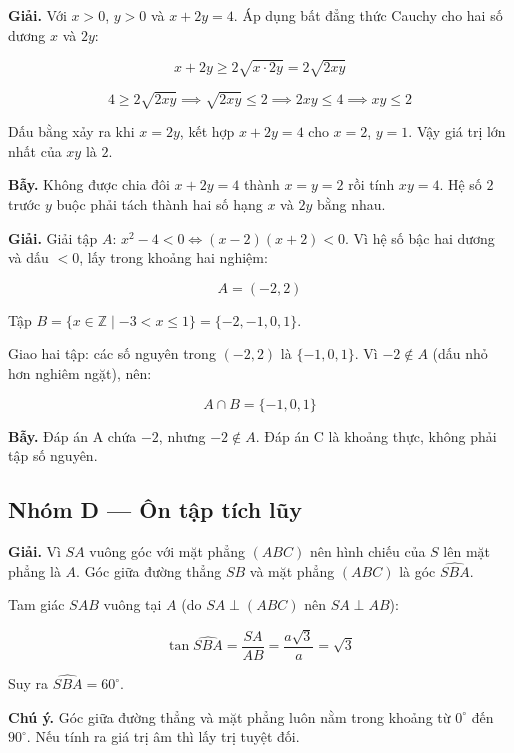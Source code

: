 \documentclass[11pt, a4paper]{article}
\begin{document}
\begin{dapan}[24 — Đáp án A]
\textbf{Giải.} Với $x > 0$, $y > 0$ và $x + 2y = 4$. Áp dụng bất đẳng thức Cauchy cho hai số dương $x$ và $2y$:

$$x + 2y \ge 2\sqrt{x \cdot 2y} = 2\sqrt{2xy}$$

$$4 \ge 2\sqrt{2xy} \implies \sqrt{2xy} \le 2 \implies 2xy \le 4 \implies xy \le 2$$

Dấu bằng xảy ra khi $x = 2y$, kết hợp $x + 2y = 4$ cho $x = 2$, $y = 1$. Vậy giá trị lớn nhất của $xy$ là $2$.

\textbf{Bẫy.} Không được chia đôi $x + 2y = 4$ thành $x = y = 2$ rồi tính $xy = 4$. Hệ số $2$ trước $y$ buộc phải tách thành hai số hạng $x$ và $2y$ bằng nhau.
\end{dapan}

\begin{dapan}[25 — Đáp án B]
\textbf{Giải.} Giải tập $A$: $x^2 - 4 < 0 \iff (x-2)(x+2) < 0$. Vì hệ số bậc hai dương và dấu $< 0$, lấy trong khoảng hai nghiệm:

$$A = (-2, 2)$$

Tập $B = \{x \in \mathbb{Z} \mid -3 < x \le 1\} = \{-2, -1, 0, 1\}$.

Giao hai tập: các số nguyên trong $(-2,2)$ là $\{-1, 0, 1\}$. Vì $-2 \notin A$ (dấu nhỏ hơn nghiêm ngặt), nên:

$$A \cap B = \{-1, 0, 1\}$$

\textbf{Bẫy.} Đáp án A chứa $-2$, nhưng $-2 \notin A$. Đáp án C là khoảng thực, không phải tập số nguyên.
\end{dapan}

\subsection*{Nhóm D — Ôn tập tích lũy}

\begin{dapan}[1 — Đáp án A]
\textbf{Giải.} Vì $SA$ vuông góc với mặt phẳng $(ABC)$ nên hình chiếu của $S$ lên mặt phẳng là $A$. Góc giữa đường thẳng $SB$ và mặt phẳng $(ABC)$ là góc $\widehat{SBA}$.

Tam giác $SAB$ vuông tại $A$ (do $SA \perp (ABC)$ nên $SA \perp AB$):

$$\tan\widehat{SBA} = \frac{SA}{AB} = \frac{a\sqrt{3}}{a} = \sqrt{3}$$

Suy ra $\widehat{SBA} = 60^\circ$.

\textbf{Chú ý.} Góc giữa đường thẳng và mặt phẳng luôn nằm trong khoảng từ $0^\circ$ đến $90^\circ$. Nếu tính ra giá trị âm thì lấy trị tuyệt đối.
\end{dapan}
\end{document}
